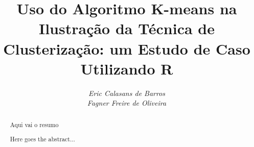 \documentclass[a4paper, 12pt]{article}
\title{\textbf{Uso do Algoritmo K-means na Ilustração da Técnica de Clusterização:  um Estudo de Caso Utilizando R}}
\author{\textit{Eric Calasans de Barros}\\\textit{Fagner Freire de Oliveira}}
\begin{document}
	\maketitle
	
	\begin{abstract}
		Aqui vai o resumo
	\end{abstract}

	{%
		\begin{abstract}
			Here goes the abstract...
		\end{abstract}	
	}
\end{document}
